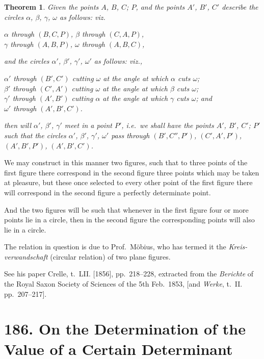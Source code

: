 \documentclass[11pt,a4paper]{book}
\newtheorem*{theorem}{Theorem}
\begin{document}
\begin{theorem}
Given the points $A$, $B$, $C$; $P$, and the points $A'$, $B'$, $C'$ describe the circles $\alpha$, $\beta$, $\gamma$, $\omega$ as follows: viz.
\begin{center}
$\alpha$ through $(B, C, P)$, \quad $\beta$ through $(C, A, P)$, \\
$\gamma$ through $(A, B, P)$, \quad $\omega$ through $(A, B, C)$,
\end{center}
and the circles $\alpha'$, $\beta'$, $\gamma'$, $\omega'$ as follows: viz.,
\begin{center}
$\alpha'$ through $(B', C')$ cutting $\omega$ at the angle at which $\alpha$ cuts $\omega$; \\
$\beta'$ through $(C', A')$ cutting $\omega$ at the angle at which $\beta$ cuts $\omega$; \\
$\gamma'$ through $(A', B')$ cutting $\alpha$ at the angle at which $\gamma$ cuts $\omega$; and \\
$\omega'$ through $(A', B', C')$.
\end{center}
then will $\alpha'$, $\beta'$, $\gamma'$ meet in a point $P'$, i.e.\ we shall have the points $A'$, $B'$, $C'$; $P'$ such that the circles $\alpha'$, $\beta'$, $\gamma'$, $\omega'$ pass through $(B', C'', P')$, $(C', A', P')$, $(A', B', P')$, $(A', B', C')$.
\end{theorem}

We may construct in this manner two figures, such that to three points of the first figure there correspond in the second figure three points which may be taken at pleasure, but these once selected to every other point of the first figure there will correspond in the second figure a perfectly determinate point.

And the two figures will be such that whenever in the first figure four or more points lie in a circle, then in the second figure the corresponding points will also lie in a circle.

The relation in question is due to Prof.\ M\"{o}bius, who has termed it the \textit{Kreis-verwandschaft} (circular relation) of two plane figures.

See his paper Crelle, t.~LII. [1856], pp.~218--228, extracted from the \textit{Berichte} of the Royal Saxon Society of Sciences of the 5th Feb.\ 1853, [and \textit{Werke}, t.~II. pp.~207--217].


\newpage
\section*{186. On the Determination of the Value of a Certain Determinant}
\end{document}
